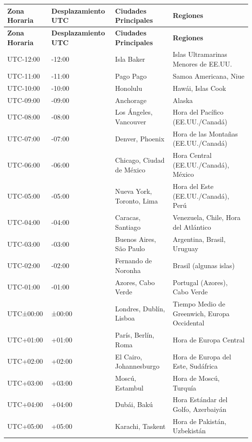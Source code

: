 \documentclass[12pt]{article}
\begin{document}
\begin{longtable}{|p{3cm}|p{2cm}|p{3cm}|p{5cm}|}
\hline
\textbf{Zona Horaria} & \textbf{Desplazamiento UTC} & \textbf{Ciudades Principales} & \textbf{Regiones} \\
\hline
\endfirsthead
\hline
\textbf{Zona Horaria} & \textbf{Desplazamiento UTC} & \textbf{Ciudades Principales} & \textbf{Regiones} \\
\hline
\endhead
\hline
\endfoot
\hline
\endlastfoot
UTC-12:00 & -12:00 & Isla Baker & Islas Ultramarinas Menores de EE.UU. \\
\hline
UTC-11:00 & -11:00 & Pago Pago & Samoa Americana, Niue \\
\hline
UTC-10:00 & -10:00 & Honolulu & Hawái, Islas Cook \\
\hline
UTC-09:00 & -09:00 & Anchorage & Alaska \\
\hline
UTC-08:00 & -08:00 & Los Ángeles, Vancouver & Hora del Pacífico (EE.UU./Canadá) \\
\hline
UTC-07:00 & -07:00 & Denver, Phoenix & Hora de las Montañas (EE.UU./Canadá) \\
\hline
UTC-06:00 & -06:00 & Chicago, Ciudad de México & Hora Central (EE.UU./Canadá), México \\
\hline
UTC-05:00 & -05:00 & Nueva York, Toronto, Lima & Hora del Este (EE.UU./Canadá), Perú \\
\hline
UTC-04:00 & -04:00 & Caracas, Santiago & Venezuela, Chile, Hora del Atlántico \\
\hline
UTC-03:00 & -03:00 & Buenos Aires, São Paulo & Argentina, Brasil, Uruguay \\
\hline
UTC-02:00 & -02:00 & Fernando de Noronha & Brasil (algunas islas) \\
\hline
UTC-01:00 & -01:00 & Azores, Cabo Verde & Portugal (Azores), Cabo Verde \\
\hline
UTC±00:00 & ±00:00 & Londres, Dublín, Lisboa & Tiempo Medio de Greenwich, Europa Occidental \\
\hline
UTC+01:00 & +01:00 & París, Berlín, Roma & Hora de Europa Central \\
\hline
UTC+02:00 & +02:00 & El Cairo, Johannesburgo & Hora de Europa del Este, Sudáfrica \\
\hline
UTC+03:00 & +03:00 & Moscú, Estambul & Hora de Moscú, Turquía \\
\hline
UTC+04:00 & +04:00 & Dubái, Bakú & Hora Estándar del Golfo, Azerbaiyán \\
\hline
UTC+05:00 & +05:00 & Karachi, Taskent & Hora de Pakistán, Uzbekistán \\

\end{longtable}
\end{document}
